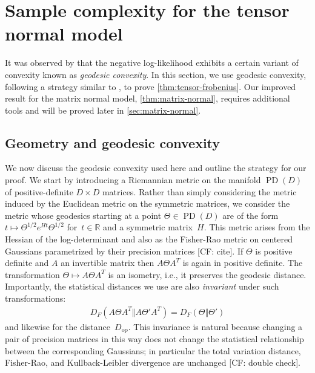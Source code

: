 \documentclass[aos]{imsart}
\theoremstyle{definition}
\numberwithin{equation}{section}
\DeclareMathOperator{\op}{op}
\DeclareMathOperator{\PD}{PD}
\DeclarePairedDelimiter{\norm}{\lVert}{\rVert}
\newcommand{\R}{{\mathbb{R}}}
\newcommand{\CF}[1]{{\color{purple}[CF: #1]}}
\begin{document}
\section{Sample complexity for the tensor normal model}\label{sec:tensor-normal}
It was observed by \cite{wiesel2012geodesic} that the negative log-likelihood exhibits a certain variant of convexity known as \emph{geodesic convexity}.
In this section, we use geodesic convexity, following a strategy similar to \cite{FM20}, to prove \cref{thm:tensor-frobenius}.
Our improved result for the matrix normal model, \cref{thm:matrix-normal}, requires additional tools and will
be proved later in \cref{sec:matrix-normal}.

\subsection{Geometry and geodesic convexity}\label{subsec:geom}
We now discuss the geodesic convexity used here and outline the strategy for our proof.
We start by introducing a Riemannian metric on the manifold $\PD(D)$ of positive-definite $D\times D$ matrices.
Rather than simply considering the metric induced by the Euclidean metric on the symmetric matrices, we consider the metric whose geodesics starting at a point $\Theta \in \PD(D)$ are of the form $t \mapsto \Theta^{1/2} e^{Ht} \Theta^{1/2}$ for~$t \in \R$ and a symmetric matrix~$H$. %
This metric arises from the Hessian of the log-determinant \citep{bhatia2009positive} and also as the Fisher-Rao metric on centered Gaussians parametrized by their precision matrices \CF{cite}.
If $\Theta$ is positive definite and $A$ an invertible matrix then $A\Theta A^T$ is again in positive definite.
The transformation $\Theta \mapsto A\Theta A^T$ is an isometry, i.e., it preserves the geodesic distance.
Importantly, the statistical distances we use are also \emph{invariant} under such transformations:
\begin{align*}
  D_F(A \Theta A^T \Vert A \Theta' A^T) = D_F(\Theta \Vert \Theta')
\end{align*}
and likewise for the distance~$D_{\op}$.
This invariance is natural because changing a pair of precision matrices in this way does not change the statistical relationship between the corresponding Gaussians; in particular the total variation distance, Fisher-Rao, and Kullback-Leibler divergence are unchanged \CF{double check}.
\end{document}

